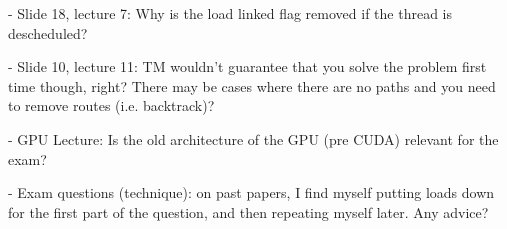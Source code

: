 - Slide 18, lecture 7: Why is the load linked flag removed if the
thread is descheduled?

- Slide 10, lecture 11: TM wouldn't guarantee that you solve the
problem first time though, right? There may be cases where there are
no paths and you need to remove routes (i.e. backtrack)?

- GPU Lecture: Is the old architecture of the GPU (pre CUDA) relevant
for the exam?

- Exam questions (technique): on past papers, I find myself putting
loads down for the first part of the question, and then repeating
myself later. Any advice?
